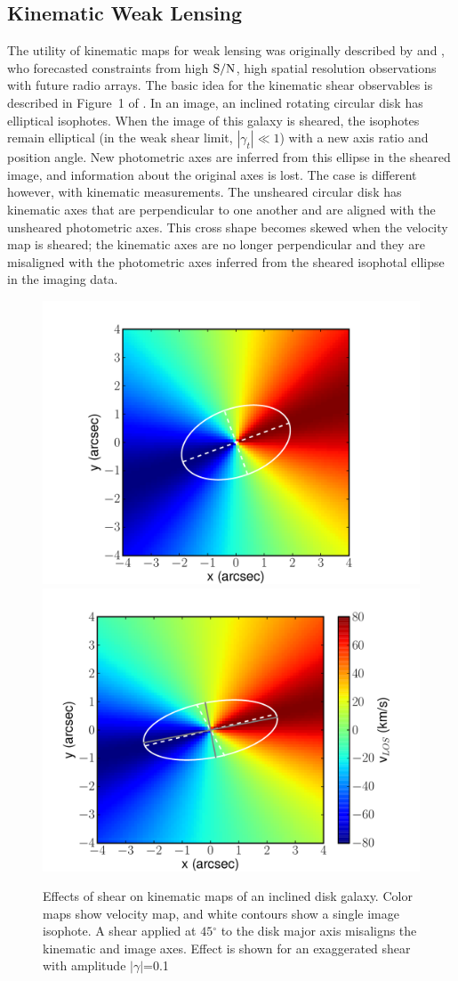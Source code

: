 \documentclass[12pt]{article}
\newcommand{\degr}{\ensuremath{^\circ}}
\begin{document}
\subsection{Kinematic Weak Lensing}

The utility of kinematic maps for weak lensing was originally described by \citet{Blain2002} and \citet{Morales2006}, who forecasted constraints from high ${\rm S/N}$, high spatial resolution observations with future radio arrays. The basic idea for the kinematic shear observables is described in Figure~1 of \citet{Morales2006}. In an image, an inclined rotating circular disk has elliptical isophotes. When the image of this galaxy is sheared, the isophotes remain elliptical (in the weak shear limit, $|\gamma_t|\ll1$) with a new axis ratio and position angle. New photometric axes are inferred from this ellipse in the sheared image, and information about the original axes is lost. The case is different however, with kinematic measurements. The unsheared circular disk has kinematic axes that are perpendicular to one another and are aligned with the unsheared photometric axes. This cross shape becomes skewed when the velocity map is sheared; the kinematic axes are no longer perpendicular and they are misaligned with the photometric axes inferred from the sheared isophotal ellipse in the imaging data.

\begin{figure}[t]
\begin{center}
\includegraphics[width=0.45\linewidth]{Plots/fig1a.pdf}
\includegraphics[width=0.45\linewidth]{Plots/fig1b.pdf}
\caption{Effects of shear on kinematic maps of an inclined disk galaxy. Color maps show velocity map, and white contours show a single image isophote. A shear applied at $45\degr$ to the disk major axis misaligns the kinematic and image axes. Effect is shown for an exaggerated shear with amplitude $|\gamma|$=0.1}
\label{fig:vmaps}
\end{center}
\end{figure}
\end{document}
